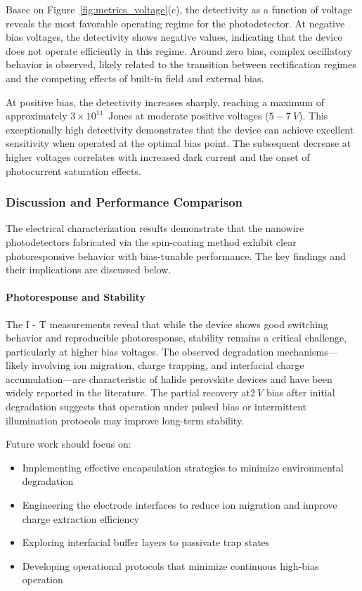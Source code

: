 \documentclass{rapportCS}
\begin{document}
	Basec on Figure~\ref{fig:metrics_voltage}(c), the detectivity as a function of voltage reveals the most favorable operating regime for the photodetector. At negative bias voltages, the detectivity shows negative values, indicating that the device does not operate efficiently in this regime. Around zero bias, complex oscillatory behavior is observed, likely related to the transition between rectification regimes and the competing effects of built-in field and external bias.
	
	At positive bias, the detectivity increases sharply, reaching a maximum of approximately $3 \times 10^{11}$~Jones at moderate positive voltages ($5 - 7~V$). This exceptionally high detectivity demonstrates that the device can achieve excellent sensitivity when operated at the optimal bias point. The subsequent decrease at higher voltages correlates with increased dark current and the onset of photocurrent saturation effects.
	
	\subsubsection{Discussion and Performance Comparison}
	
	The electrical characterization results demonstrate that the  nanowire photodetectors fabricated via the spin-coating method exhibit clear photoresponsive behavior with bias-tunable performance. The key findings and their implications are discussed below.
	
	\paragraph{Photoresponse and Stability}
	
	The I - T measurements reveal that while the device shows good switching behavior and reproducible photoresponse, stability remains a critical challenge, particularly at higher bias voltages. The observed degradation mechanisms—likely involving ion migration, charge trapping, and interfacial charge accumulation—are characteristic of halide perovskite devices and have been widely reported in the literature. The partial recovery at$ 2~V$ bias after initial degradation suggests that operation under pulsed bias or intermittent illumination protocols may improve long-term stability.
	
	Future work should focus on:
	\begin{itemize}
		\item Implementing effective encapsulation strategies to minimize environmental degradation
		\item Engineering the electrode interfaces to reduce ion migration and improve charge extraction efficiency
		\item Exploring interfacial buffer layers to passivate trap states
		\item Developing operational protocols that minimize continuous high-bias operation
	\end{itemize}
	
\end{document}
